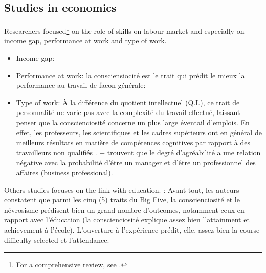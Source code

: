 \documentclass[a4paper, 11pt, onecolumn]{article}
\begin{document}
	
\subsection{Studies in economics}

Researchers focused\footnote{For a comprehensive review, see \cite{Almlund2011}.} on the role of skills on labour market and especially on income gap, performance at work and type of work.

\begin{itemize}
\item Income gap: \citep{Bowles2001} \citep{Heckman2006}  \citep{Cawley2001}
\item Performance at work: la consciensiocité est le trait qui prédit le mieux la performance au travail de facon générale: \citep{Nyhus2005} \citep{Salgado1997} \citep{Hogan2003} \citep{Barrick1991}
\item Type of work: À la différence du quotient intellectuel (Q.I.), ce trait de personnalité ne varie pas avec la complexité du travail effectué, laissant penser que la conscienciosité concerne un plus large éventail d’emplois. En effet, les professeurs, les scientifiques et les cadres supérieurs ont en général de meilleurs résultats en matière de compétences cognitives par rapport à des travailleurs non qualifiés \citep{Schmidt2004} \citep{Almlund2011} \citep{Barrick1991}. + \citep{CobbClark2011} trouvent que le degré d’agréabilité a une relation négative avec la probabilité d’être un manager et d’être un professionnel des affaires (business professional).
\end{itemize}

Others studies focuses on the link with education.
\cite{Almlund2011} : Avant tout, les auteurs constatent que parmi les cinq (5) traits du Big Five, la conscienciosité et le névrosisme prédisent bien un grand nombre d’outcomes, notamment ceux en rapport avec l’éducation (la conscienciosité explique assez bien l’attainment et achievement à l’école). L’ouverture à l’expérience prédit, elle, assez bien la course difficulty selected et l’attendance.

\end{document}
